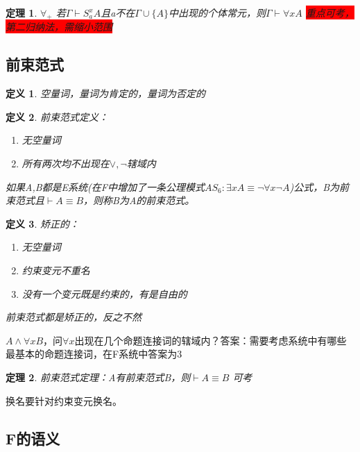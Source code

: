 \documentclass[a4paper]{ctexart}
\newtheorem{thm}{\hspace{2em}定理}[subsection]
\newtheorem{defi}{\hspace{2em}定义}[subsection]
\newcommand{\shade}[1]{\colorbox{shadecolor}{#1}}
\newcommand{\redshade}[1]{\colorbox{red}{#1}}
\begin{document}
\begin{thm}
  $\forall{}_+$ 若$\Gamma\vdash S_a^xA$且a不在$\Gamma\cup\{A\}$中出现的个体常元，则$\Gamma\vdash \forall{x}A$ \redshade{重点可考，第二归纳法，需缩小范围}
\end{thm}

\subsection{前束范式}

\begin{defi}
  空量词，量词为肯定的，量词为否定的
\end{defi}

\begin{defi}
  前束范式定义：
  \begin{enumerate}[itemindent=2em]
    \item 无空量词 
    \item 所有两次均不出现在$\vee,\neg$辖域内
  \end{enumerate}
  如果A,B都是E系统(在F中增加了一条公理模式$AS_6:\exists{x}A\equiv\neg\forall{x}\neg A$)公式，B为前束范式且$\vdash A\equiv B$，则称B为A的前束范式。
\end{defi}

\begin{defi}
  矫正的：
  \begin{enumerate}[itemindent=2em]
    \item 无空量词
    \item 约束变元不重名
    \item 没有一个变元既是约束的，有是自由的
  \end{enumerate}
  前束范式都是矫正的，反之不然
\end{defi}

$A\wedge\forall{x}B$，问$\forall{x}$出现在几个命题连接词的辖域内？答案：需要考虑系统中有哪些最基本的命题连接词，在F系统中答案为3

\begin{thm}
  前束范式定理：A有前束范式B，则$\vdash A\equiv B$ \shade{可考}
\end{thm}
换名要针对约束变元换名。

\subsection{F的语义}
\end{document}
